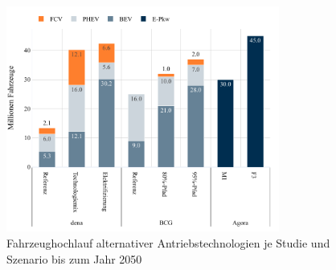 \begin{figure}[H]
    \centering
    \includegraphics[width=0.8\textwidth]{Bilder/RampUp-2050-Focus-MA}
    \caption{Fahrzeughochlauf alternativer Antriebstechnologien je Studie und Szenario bis zum Jahr \num{2050}}\label{fig:RampUp2050}
\end{figure}